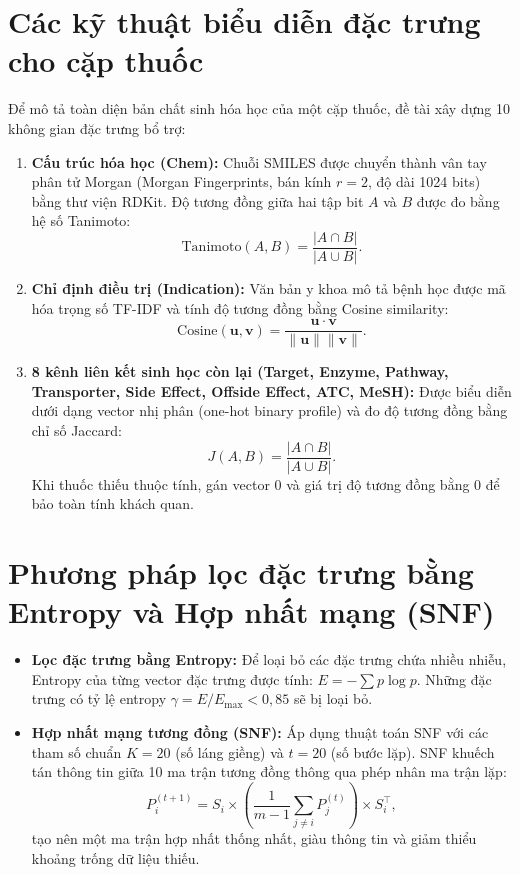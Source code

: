 \documentclass[12pt,a4paper,oneside]{report}
\begin{document}
\section{Các kỹ thuật biểu diễn đặc trưng cho cặp thuốc}
Để mô tả toàn diện bản chất sinh hóa học của một cặp thuốc, đề tài xây dựng 10 không gian đặc trưng bổ trợ:
\begin{enumerate}
  \item \textbf{Cấu trúc hóa học (Chem):} Chuỗi SMILES được chuyển thành vân tay phân tử Morgan (Morgan Fingerprints, bán kính $r=2$, độ dài 1024 bits) bằng thư viện RDKit. Độ tương đồng giữa hai tập bit $A$ và $B$ được đo bằng hệ số Tanimoto:
  \begin{equation}
    \text{Tanimoto}(A, B) = \frac{|A \cap B|}{|A \cup B|}.
  \end{equation}
  \item \textbf{Chỉ định điều trị (Indication):} Văn bản y khoa mô tả bệnh học được mã hóa trọng số TF-IDF và tính độ tương đồng bằng Cosine similarity:
  \begin{equation}
    \text{Cosine}(\mathbf{u}, \mathbf{v}) = \frac{\mathbf{u} \cdot \mathbf{v}}{\|\mathbf{u}\| \|\mathbf{v}\|}.
  \end{equation}
  \item \textbf{8 kênh liên kết sinh học còn lại (Target, Enzyme, Pathway, Transporter, Side Effect, Offside Effect, ATC, MeSH):} Được biểu diễn dưới dạng vector nhị phân (one-hot binary profile) và đo độ tương đồng bằng chỉ số Jaccard:
  \begin{equation}
    J(A, B) = \frac{|A \cap B|}{|A \cup B|}.
  \end{equation}
  Khi thuốc thiếu thuộc tính, gán vector 0 và giá trị độ tương đồng bằng 0 để bảo toàn tính khách quan.
\end{enumerate}

\section{Phương pháp lọc đặc trưng bằng Entropy và Hợp nhất mạng (SNF)}
\begin{itemize}
  \item \textbf{Lọc đặc trưng bằng Entropy:} Để loại bỏ các đặc trưng chứa nhiều nhiễu, Entropy của từng vector đặc trưng được tính: $E = -\sum p \log p$. Những đặc trưng có tỷ lệ entropy $\gamma = E / E_{\max} < 0{,}85$ sẽ bị loại bỏ.
  \item \textbf{Hợp nhất mạng tương đồng (SNF):} Áp dụng thuật toán SNF \cite{wang2014} với các tham số chuẩn $K=20$ (số láng giềng) và $t=20$ (số bước lặp). SNF khuếch tán thông tin giữa 10 ma trận tương đồng thông qua phép nhân ma trận lặp:
  \begin{equation}
    P^{(t+1)}_i = S_i \times \left(\frac{1}{m-1} \sum_{j \neq i} P^{(t)}_j\right) \times S_i^{\top},
  \end{equation}
  tạo nên một ma trận hợp nhất thống nhất, giàu thông tin và giảm thiểu khoảng trống dữ liệu thiếu.
\end{itemize}
\end{document}

